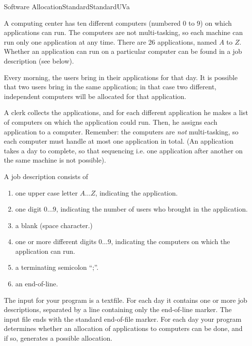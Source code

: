 \begin{problema}{Software Allocation}{Standard}{Standard}{UVa}

A computing center has ten different computers (numbered 0 to 9) on which applications can run. The computers are not multi-tasking, so each machine can run only one application at any time. There are 26 applications, named $A$ to $Z$. Whether an application can run on a particular computer can be found in a job description (see below). 


Every morning, the users bring in their applications for that day. It is possible that two users bring in the same application; in that case two different, independent computers will be allocated for that application. 



A clerk collects the applications, and for each different application he makes a list of computers on which the application could run. Then, he assigns each application to a computer. Remember: the computers are \emph{not} multi-tasking, so each computer must handle at most one application in total. (An application takes a day to complete, so that sequencing i.e. one application after another on the same machine is not possible). 

A job description consists of 

\begin{enumerate}
\item one upper case letter $A\dots Z$, indicating the application.
\item one digit $0\dots 9$, indicating the number of users who brought in the application.
\item a blank (space character.)
\item one or more different digits $0\dots 9$, indicating the computers on which the application can run.
\item a terminating semicolon ``;''.
\item an end-of-line. 
\end{enumerate}



\InputFile

The input for your program is a textfile. For each day it contains one or more job descriptions, separated by a line containing only the end-of-line marker. The input file ends with the standard end-of-file marker. For each day your program determines whether an allocation of applications to computers can be done, and if so, generates a possible allocation. 



\end{problema}

